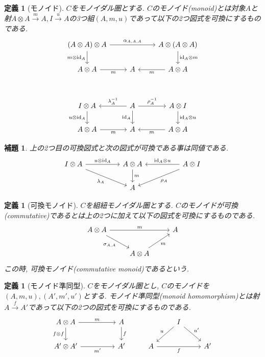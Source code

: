 \documentclass[a4paper,12pt]{ltjsarticle}
\theoremstyle{break}
\newtheorem{defn}[thm]{定義}
\newtheorem{lem}[thm]{補題}
\newcommand{\xr}[1]{\xrightarrow{#1}}
\newcommand{\id}{\mathrm{id}}
\newcommand{\al}{\alpha}
\newcommand{\la}{\lambda}
\newcommand{\si}{\sigma}
\newcommand{\ot}{\otimes}
\numberwithin{equation}{section}
\begin{document}
\begin{defn}[モノイド]
  $C$をモノイダル圏とする. 
  $C$のモノイド(monoid)とは対象$A$と射$A \ot A \xr{m} A, I \xr{u} A$の3つ組$(A,m,u)$であって以下の2つ図式を可換にするものである. 
  \[\begin{tikzcd}
    {(A \ot A) \ot A} && {A \ot (A \ot A)} \\
    {A \ot A} & A & {A \ot A} \\
    \\
    {I \ot A} & A & {A \ot I} \\
    {A \ot A} & A & {A \ot A}
    \arrow["{\id_A \ot m}", from=1-3, to=2-3]
    \arrow["{\al_{A,A,A}}", from=1-1, to=1-3]
    \arrow["{m \ot \id_A}"', from=1-1, to=2-1]
    \arrow["m", from=2-3, to=2-2]
    \arrow["m"', from=2-1, to=2-2]
    \arrow["\id_A"', from=4-2, to=5-2]
    \arrow["{\rho_A^{-1}}", from=4-2, to=4-3]
    \arrow["{\id_A \ot u}", from=4-3, to=5-3]
    \arrow["m", from=5-3, to=5-2]
    \arrow["{\la_A^{-1}}"', from=4-2, to=4-1]
    \arrow["{u \ot \id_A}"', from=4-1, to=5-1]
    \arrow["m"', from=5-1, to=5-2]
  \end{tikzcd}\]
\end{defn}

\begin{lem} 
  上の2つ目の可換図式と次の図式が可換である事は同値である.
  \[\begin{tikzcd}
    {I \ot A} && {A \ot A} && {A \ot I} \\
    && A
    \arrow["{\id_A \ot u}"', from=1-5, to=1-3]
    \arrow["{u \ot \id_A}", from=1-1, to=1-3]
    \arrow["m", from=1-3, to=2-3]
    \arrow["{\rho_A}", from=1-5, to=2-3]
    \arrow["{\la_A}"', from=1-1, to=2-3]
  \end{tikzcd}\]
\end{lem}

\begin{defn}[可換モノイド]
  $C$を組紐モノイダル圏とする. 
  $C$のモノイドが可換(commutative)であるとは上の2つに加えて以下の図式を可換にするものである. 
  \[\begin{tikzcd}
    {A \ot A} && A \\
    & {A \ot A}
    \arrow["m", from=1-1, to=1-3]
    \arrow["{\si_{A,A}}"', from=1-1, to=2-2]
    \arrow["m"', from=2-2, to=1-3]
  \end{tikzcd}\]
  この時, 可換モノイド(commutative monoid)であるという. 
\end{defn}

\begin{defn}[モノイド準同型]
  $C$をモノイダル圏とし, $C$のモノイドを$(A,m,u), (A',m',u')$とする. 
  モノイド準同型(monoid homomorphism)とは射$A \xr{f} A'$であって以下の2つの図式を可換にするものである. 
  \[\begin{tikzcd}
    {A \ot A} && A && I \\
    {A' \ot A'} && {A'} & A && {A'}
    \arrow["m", from=1-1, to=1-3]
    \arrow["f", from=1-3, to=2-3]
    \arrow["{f \ot f}"', from=1-1, to=2-1]
    \arrow["{m'}"', from=2-1, to=2-3]
    \arrow["u"', from=1-5, to=2-4]
    \arrow["f"', from=2-4, to=2-6]
    \arrow["{u'}", from=1-5, to=2-6]
  \end{tikzcd}\]
\end{defn}
\end{document}
